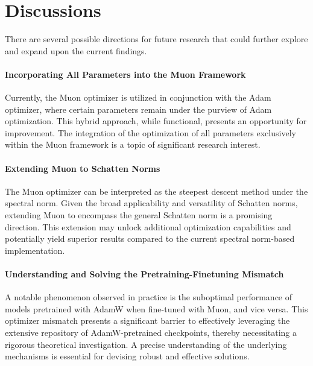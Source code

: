 \section{Discussions}

There are several possible directions for future research that could further explore and expand upon the current findings.

\paragraph{Incorporating All Parameters into the Muon Framework}
Currently, the Muon optimizer is utilized in conjunction with the Adam optimizer, where certain parameters remain under the purview of Adam optimization. This hybrid approach, while functional, presents an opportunity for improvement. The integration of the optimization of all parameters exclusively within the Muon framework is a topic of significant research interest.

\paragraph{Extending Muon to Schatten Norms}
The Muon optimizer can be interpreted as the steepest descent method under the spectral norm. Given the broad applicability and versatility of Schatten norms, extending Muon to encompass the general Schatten norm is a promising direction. This extension may unlock additional optimization capabilities and potentially yield superior results compared to the current spectral norm-based implementation.

\paragraph{Understanding and Solving the Pretraining-Finetuning Mismatch}
A notable phenomenon observed in practice is the suboptimal performance of models pretrained with AdamW when fine-tuned with Muon, and vice versa. This optimizer mismatch presents a significant barrier to effectively leveraging the extensive repository of AdamW-pretrained checkpoints, thereby necessitating a rigorous theoretical investigation. A precise understanding of the underlying mechanisms is essential for devising robust and effective solutions.

